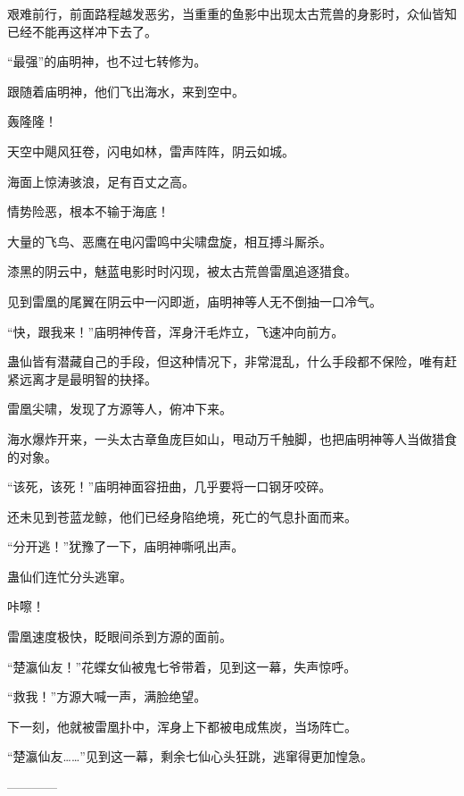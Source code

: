 \begin{this_body}
艰难前行，前面路程越发恶劣，当重重的鱼影中出现太古荒兽的身影时，众仙皆知已经不能再这样冲下去了。

“最强”的庙明神，也不过七转修为。

跟随着庙明神，他们飞出海水，来到空中。

轰隆隆！

天空中飓风狂卷，闪电如林，雷声阵阵，阴云如城。

海面上惊涛骇浪，足有百丈之高。

情势险恶，根本不输于海底！

大量的飞鸟、恶鹰在电闪雷鸣中尖啸盘旋，相互搏斗厮杀。

漆黑的阴云中，魅蓝电影时时闪现，被太古荒兽雷凰追逐猎食。

见到雷凰的尾翼在阴云中一闪即逝，庙明神等人无不倒抽一口冷气。

“快，跟我来！”庙明神传音，浑身汗毛炸立，飞速冲向前方。

蛊仙皆有潜藏自己的手段，但这种情况下，非常混乱，什么手段都不保险，唯有赶紧远离才是最明智的抉择。

雷凰尖啸，发现了方源等人，俯冲下来。

海水爆炸开来，一头太古章鱼庞巨如山，甩动万千触脚，也把庙明神等人当做猎食的对象。

“该死，该死！”庙明神面容扭曲，几乎要将一口钢牙咬碎。

还未见到苍蓝龙鲸，他们已经身陷绝境，死亡的气息扑面而来。

“分开逃！”犹豫了一下，庙明神嘶吼出声。

蛊仙们连忙分头逃窜。

咔嚓！

雷凰速度极快，眨眼间杀到方源的面前。

“楚瀛仙友！”花蝶女仙被鬼七爷带着，见到这一幕，失声惊呼。

“救我！”方源大喊一声，满脸绝望。

下一刻，他就被雷凰扑中，浑身上下都被电成焦炭，当场阵亡。

“楚瀛仙友……”见到这一幕，剩余七仙心头狂跳，逃窜得更加惶急。

------------

\end{this_body}

